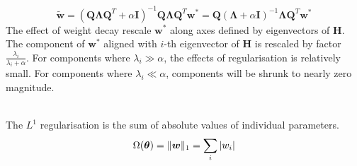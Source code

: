 \begin{remark}
\begin{equation}
\tilde{\bm{w}} = (\bm{Q} \bm{\Lambda} \bm{Q}^T + \alpha \bm{I})^{-1} \bm{Q} \bm{\Lambda} \bm{Q}^T \bm{w}^* = \bm{Q} (\bm{\Lambda} + \alpha \bm{I})^{-1} \bm{\Lambda} \bm{Q}^T \bm{w}^* \nonumber
\end{equation}
The effect of weight decay rescale $\bm{w}^*$ along axes defined by eigenvectors of $\bm{H}$. The component of $\bm{w}^*$ aligned with $i$-th eigenvector of $\bm{H}$ is rescaled by factor $\frac{\lambda_i}{\lambda_i + \alpha}$. For components where $\lambda_i \gg \alpha$, the effects of regularisation is relatively small. For components where $\lambda_i \ll \alpha$, components will be shrunk to nearly zero magnitude.
\end{remark}

\begin{definition} \\
The $L^1$ regularisation is the sum of absolute values of individual parameters.
\begin{equation}
\Omega(\bm{\theta}) = \Vert \bm{w} \Vert_1 = \sum_i \left\lvert w_i\right\rvert \nonumber
\end{equation}
\end{definition}


